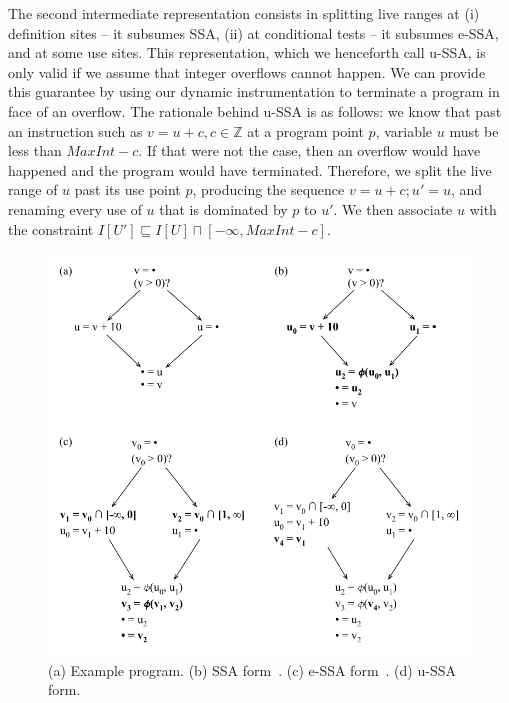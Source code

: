 \documentclass[preprint]{sigplanconf}[10pt]
\begin{document}
The second intermediate representation consists in splitting live ranges at
(i) definition sites -- it subsumes SSA, (ii) at conditional tests -- it
subsumes e-SSA, and at some use sites.
This representation, which we henceforth call u-SSA, is only valid if we
assume that integer overflows cannot happen.
We can provide this guarantee by using our dynamic instrumentation to terminate
a program in face of an overflow.
The rationale behind u-SSA is as follows: we know that past an instruction such
as $v = u + c, c \in \mathbb{Z}$ at a program point $p$, variable $u$ must be
less than $\mathit{MaxInt} - c$.
If that were not the case, then an overflow would have happened and the
program would have terminated.
Therefore, we split the live range of $u$ past its use point $p$, producing the
sequence $v = u + c; u' = u$, and renaming every use of $u$ that is dominated
by $p$ to $u'$.
We then associate $u$ with the constraint $I[U'] \sqsubseteq I[U] \sqcap [-\infty, \mathit{MaxInt} - c]$.

\begin{figure}[t!]
\begin{center}
\includegraphics[width=\columnwidth]{images/ex_ir}
\end{center}
\caption{\label{fig:ex_ir}
(a) Example program.
(b) SSA form~\cite{Cytron91}.
(c) e-SSA form~\cite{Bodik00}.
(d) u-SSA form.}
\end{figure}
\end{document}
